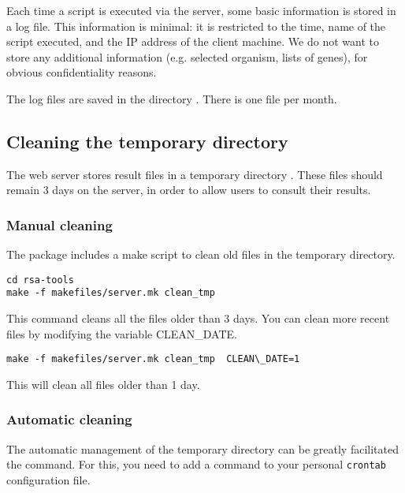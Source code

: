 \documentclass[12pt,a4paper, twoside]{scrreprt} %
\begin{document}
Each time a script is executed via the \RSAT server, some basic
information is stored in a log file. This information is minimal: it
is restricted to the time, name of the script executed, and the IP
address of the client machine. We do not want to store any additional
information (e.g. selected organism, lists of genes), for obvious
confidentiality reasons.

The log files are saved in the directory . There
is one file per month.


\subsection{Cleaning the temporary directory}

The web server stores result files in a temporary directory
. These files should remain 3 days on
the server, in order to allow users to consult their results.

\subsubsection{Manual cleaning}

The \RSAT package includes a make script to clean old files in the
temporary directory.

\begin{verbatim}
cd rsa-tools
make -f makefiles/server.mk clean_tmp
\end{verbatim}

This command cleans all the files older than 3 days. You can clean
more recent files by modifying the variable CLEAN\_DATE.

\begin{verbatim}
make -f makefiles/server.mk clean_tmp  CLEAN\_DATE=1
\end{verbatim}

This will clean all files older than 1 day.

\subsubsection{Automatic cleaning}

The automatic management of the temporary directory can be greatly
facilitated the  command. For this, you need to add a
command to your personal \texttt{crontab} configuration file.
\end{document}
